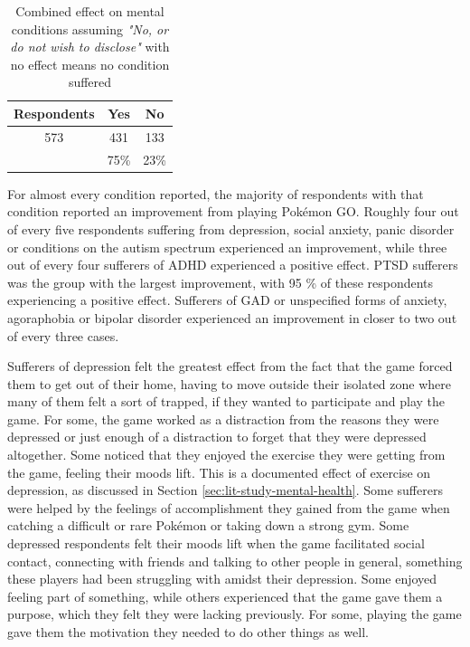 \begin{table}[h]
	\centering
	\caption{Combined effect on mental conditions assuming \emph{"No, or do not wish to disclose"} with no effect means no condition suffered}
	\label{tbl:mental-conditions-without-undisclosed-no}
	\begin{tabular}{|c|c|c|}
		\hline
		\textbf{Respondents} & \textbf{Yes} & \textbf{No}\\
		\hline\hline
		573		& 431		& 133\\
		& 75\%		& 23\%\\\hline
	\end{tabular}
\end{table}

For almost every condition reported, the majority of respondents with that condition reported an improvement from playing Pokémon GO. Roughly four out of every five respondents suffering from depression, social anxiety, panic disorder or conditions on the autism spectrum experienced an improvement, while three out of every four sufferers of ADHD experienced a positive effect. PTSD sufferers was the group with the largest improvement, with 95 \% of these respondents experiencing a positive effect. Sufferers of GAD or unspecified forms of anxiety, agoraphobia or bipolar disorder experienced an improvement in closer to two out of every three cases.

Sufferers of depression felt the greatest effect from the fact that the game forced them to get out of their home, having to move outside their isolated zone where many of them felt a sort of trapped, if they wanted to participate and play the game. For some, the game worked as a distraction from the reasons they were depressed or just enough of a distraction to forget that they were depressed altogether. Some noticed that they enjoyed the exercise they were getting from the game, feeling their moods lift. This is a documented effect of exercise on depression, as discussed in Section \ref{sec:lit-study-mental-health}. Some sufferers were helped by the feelings of accomplishment they gained from the game when catching a difficult or rare Pokémon or taking down a strong gym. Some depressed respondents felt their moods lift when the game facilitated social contact, connecting with friends and talking to other people in general, something these players had been struggling with amidst their depression. Some enjoyed feeling part of something, while others experienced that the game gave them a purpose, which they felt they were lacking previously. For some, playing the game gave them the motivation they needed to do other things as well.

